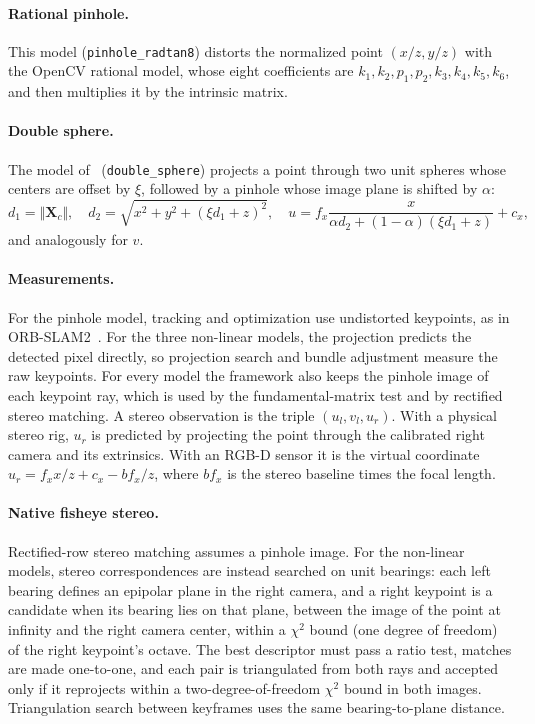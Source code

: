 \documentclass{article}
\let\oldparagraph\paragraph
\renewcommand{\paragraph}[1]{\oldparagraph{#1}\mbox{}}
\begin{document}
\paragraph{Rational pinhole.} This model (\texttt{pinhole\_radtan8}) distorts the normalized point $(x/z, y/z)$ with the OpenCV rational model, whose eight coefficients are $k_1, k_2, p_1, p_2, k_3, k_4, k_5, k_6$, and then multiplies it by the intrinsic matrix.

\paragraph{Double sphere.} The model of~\cite{usenko2018double} (\texttt{double\_sphere}) projects a point through two unit spheres whose centers are offset by $\xi$, followed by a pinhole whose image plane is shifted by $\alpha$:
\begin{equation}
d_1 = \Vert \mathbf{X}_c \Vert, \quad d_2 = \sqrt{x^2 + y^2 + (\xi d_1 + z)^2}, \quad
u = f_x \frac{x}{\alpha d_2 + (1 - \alpha)(\xi d_1 + z)} + c_x ,
\end{equation}
and analogously for $v$.

\paragraph{Measurements.} For the pinhole model, tracking and optimization use undistorted keypoints, as in ORB-SLAM2~\cite{ORB_SLAM2}. For the three non-linear models, the projection predicts the detected pixel directly, so projection search and bundle adjustment measure the raw keypoints. For every model the framework also keeps the pinhole image of each keypoint ray, which is used by the fundamental-matrix test and by rectified stereo matching. A stereo observation is the triple $(u_l, v_l, u_r)$. With a physical stereo rig, $u_r$ is predicted by projecting the point through the calibrated right camera and its extrinsics. With an RGB-D sensor it is the virtual coordinate $u_r = f_x x/z + c_x - b f_x / z$, where $b f_x$ is the stereo baseline times the focal length.

\paragraph{Native fisheye stereo.} Rectified-row stereo matching assumes a pinhole image. For the non-linear models, stereo correspondences are instead searched on unit bearings: each left bearing defines an epipolar plane in the right camera, and a right keypoint is a candidate when its bearing lies on that plane, between the image of the point at infinity and the right camera center, within a $\chi^2$ bound (one degree of freedom) of the right keypoint's octave. The best descriptor must pass a ratio test, matches are made one-to-one, and each pair is triangulated from both rays and accepted only if it reprojects within a two-degree-of-freedom $\chi^2$ bound in both images. Triangulation search between keyframes uses the same bearing-to-plane distance.
\end{document}
